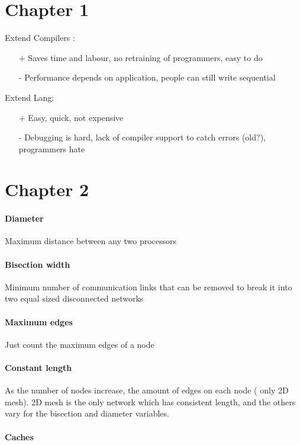 \section{Chapter 1}

Extend Compilers :
\begin{itemize}
\item[+]Saves time and labour, no retraining of programmers, easy to do
\item[-]Performance depends on application, people can still write sequential
\end{itemize}


Extend Lang:
\begin{itemize}
\item[+]Easy, quick, not expensive
\item[-]Debugging is hard, lack of compiler support to catch errors (old?), programmers hate
\end{itemize}
\section{Chapter 2}

\paragraph{Diameter}
Maximum distance between any two processors

\paragraph{Bisection width}
Minimum number of communication links that can be removed to break it into two equal sized disconnected networks

\paragraph{Maximum edges}
Just count the maximum edges of a node

\paragraph{Constant length}
As the number of nodes increase, the amount of edges on each node ( only 2D mesh). 2D mesh is the only network which has consistent length, and the others vary for the bisection and diameter variables.

\paragraph{Caches}

